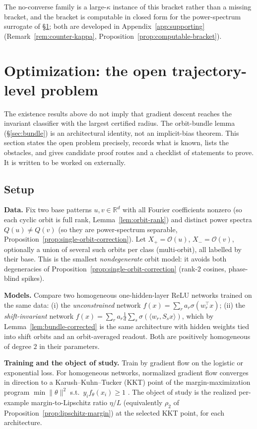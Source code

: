 \documentclass[11pt]{article}
\theoremstyle{plain}
\theoremstyle{definition}
\theoremstyle{remark}
\newcommand{\R}{\mathbb{R}}
\newcommand{\Orb}{\mathcal O}
\begin{document}
The no-converse family is a large-$\kappa$ instance of this bracket rather than a missing bracket, and the bracket is computable in closed form for the power-spectrum surrogate of \S\ref{sec:opt-open}; both are developed in Appendix~\ref{app:supporting} (Remark~\ref{rem:counter-kappa}, Proposition~\ref{prop:computable-bracket}).

\section{Optimization: the open trajectory-level problem}\label{sec:opt-open}
The existence results above do not imply that gradient descent reaches the invariant classifier with the largest certified radius.  The orbit-bundle lemma (\S\ref{sec:bundle}) is an architectural identity, not an implicit-bias theorem.  This section states the open problem precisely, records what is known, lists the obstacles, and gives candidate proof routes and a checklist of statements to prove.  It is written to be worked on externally.

\subsection{Setup}
\textbf{Data.}  Fix two base patterns $u,v\in\R^d$ with all Fourier coefficients nonzero (so each cyclic orbit is full rank, Lemma~\ref{lem:orbit-rank}) and distinct power spectra $Q(u)\neq Q(v)$ (so they are power-spectrum separable, Proposition~\ref{prop:single-orbit-correction}).  Let $X_+=\Orb(u)$, $X_-=\Orb(v)$, optionally a union of several such orbits per class (multi-orbit), all labelled by their base.  This is the smallest \emph{nondegenerate} orbit model: it avoids both degeneracies of Proposition~\ref{prop:single-orbit-correction} (rank-$2$ cosines, phase-blind spikes).

\textbf{Models.}  Compare two homogeneous one-hidden-layer ReLU networks trained on the same data: (i) the \emph{unconstrained} network $f(x)=\sum_r a_r\sigma(w_r^\top x)$; (ii) the \emph{shift-invariant} network $f(x)=\sum_r a_r\frac1d\sum_{s}\sigma(\langle w_r,S_sx\rangle)$, which by Lemma~\ref{lem:bundle-corrected} is the same architecture with hidden weights tied into shift orbits and an orbit-averaged readout.  Both are positively homogeneous of degree $2$ in their parameters.

\textbf{Training and the object of study.}  Train by gradient flow on the logistic or exponential loss.  For homogeneous networks, normalized gradient flow converges in direction to a Karush--Kuhn--Tucker (KKT) point of the margin-maximization program $\min\|\theta\|^2$ s.t.\ $y_i f_\theta(x_i)\ge1$ \citep{Lyu2020,Ji2020,Soudry2018}.  The object of study is the realized per-example margin-to-Lipschitz ratio $\eta/L$ (equivalently $\rho_2$ of Proposition~\ref{prop:lipschitz-margin}) at the selected KKT point, for each architecture.
\end{document}
